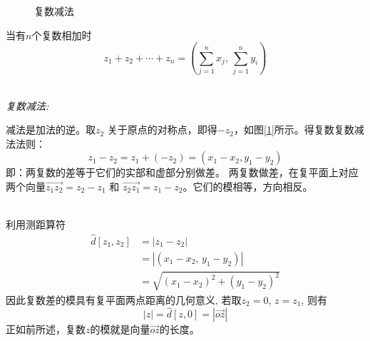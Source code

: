 \begin{figure}[h]
\begin{minipage}[t]{0.49\textwidth}
        \caption{复数减法}
        \label{fig:fsjjf2}
    \end{minipage}
 \end{figure}
\begin{corollary}\label{}
    \noindent 当有$n$个复数相加时
    \begin{equation}\label{} z_1 + z_2  + \cdots + z_n = (\sum_{j=1}^n x_j,\, \sum_{j=1}^n y_i)   
    \end{equation}
\end{corollary}

~\\
\noindent \emph{复数减法: }

减法是加法的逆。取$z_2$ 关于原点的对称点，即得$-z_2$，如图[\ref{fig:fsjjf2}]所示。得复数复数减法法则：
\begin{equation}\label{}
    z_1 - z_2 = z_1 +(-z_2) = (x_1 - x_2, y_1 - y_2) 
\end{equation}
即：两复数的差等于它们的实部和虚部分别做差。
两复数做差，在复平面上对应两个向量$\overrightarrow{z_1 z_2} = z_2 -z_1$ 和 $\overrightarrow{z_2 z_1} = z_1 -z_2$。它们的模相等，方向相反。 

~\\
利用测距算符
\begin{equation}\label{}
    \begin{aligned}
        \hat{d}[z_1, z_2] &= \left\vert z_1 - z_2\right\vert \\
            &=  \left\vert (x_1-x_2, \, y_1-y_2)\right\vert \\
            &= \sqrt{(x_1-x_2)^2 + (y_1-y_2)^2}  
        \end{aligned} 
\end{equation}
因此复数差的模具有复平面两点距离的几何意义, 
若取$z_2 =0$, $z =z_1$, 则有
        \[\left\vert z\right\vert = \hat{d}[z, 0] =  \left\vert \overrightarrow{oz}\right\vert\]
正如前所述，复数$z$的模就是向量$\overrightarrow{oz}$的长度。


